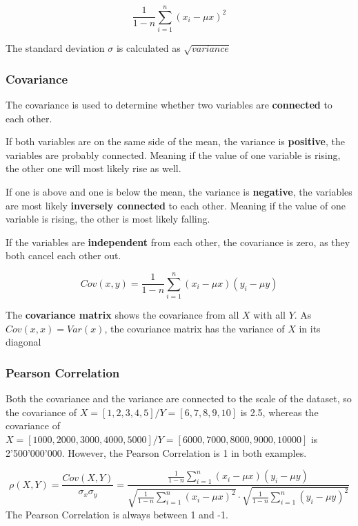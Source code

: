 \documentclass[11pt]{article}
\begin{document}
\begin{equation}
    \frac{1}{1-n} \sum^{n}_{i=1}(x_{i} - \mu x)^2
\end{equation}

The standard deviation $\sigma$ is calculated as $\sqrt{variance}$

\newpage

\subsubsection{Covariance} \label{sec:covariance}
The covariance is used to determine whether two variables are \textbf{connected} to each other.

If both variables are on the same side of the mean, the variance is \textbf{positive}, the variables are probably connected. Meaning if the value of one variable is rising, the other one will most likely rise as well.

If one is above and one is below the mean, the variance is \textbf{negative}, the variables are most likely \textbf{inversely connected} to each other. Meaning if the value of one variable is rising, the other is most likely falling.

If the variables are \textbf{independent} from each other, the covariance is zero, as they both cancel each other out.

\begin{equation}
    Cov(x,y) = \frac{1}{1-n} \sum^{n}_{i=1}(x_{i} - \mu x)(y_{i} - \mu y)
\end{equation}

The \textbf{covariance matrix} shows the covariance from all $X$ with all $Y$. As $Cov(x,x) = Var(x)$, the covariance matrix has the variance of $X$ in its diagonal


\subsubsection{Pearson Correlation} \label{sec:pearson}
Both the covariance and the variance are connected to the scale of the dataset, so the covariance of $X=[1,2,3,4,5] / Y=[6,7,8,9,10]$ is 2.5, whereas the covariance of $X=[1000,2000,3000,4000,5000] / Y=[6000,7000,8000,9000,10000]$ is 2'500'000'000. However, the Pearson Correlation is 1 in both examples.

\begin{equation}
    \rho(X,Y)=\frac{Cov(X,Y)}{\sigma_{x} \sigma_{y}} =
    \frac{\frac{1}{1-n} \sum^{n}_{i=1}(x_{i} - \mu x)(y_{i} - \mu y)}{\sqrt{\frac{1}{1-n} \sum^{n}_{i=1}(x_{i} - \mu x)^2} \cdot \sqrt{\frac{1}{1-n} \sum^{n}_{i=1}(y_{i} - \mu y)^2}}
\end{equation}
The Pearson Correlation is always between 1 and -1.
\end{document}
